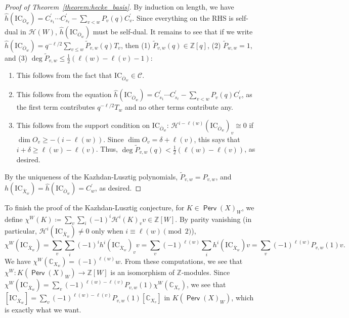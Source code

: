 \documentclass[leqno, openany]{memoir}
\theoremstyle{definition}
\theoremstyle{remark}
\theoremstyle{plain}
\theoremstyle{definition}
\theoremstyle{remark}
\newcommand{\mr}[1]{\mathrm{#1}}
\newcommand{\ms}[1]{\mathsf{#1}}
\DeclareMathOperator{\Perv}{\ms{Perv}}
\begin{document}
\begin{proof}[Proof of Theorem~\ref{theorem:hecke_basis}]
By induction on length, we have $\widehat{h}(\mr{IC}_{\overline{O}_w}) = C_{s_1}^{\prime}\cdots C_{s_{\ell}}^{\prime} - \sum_{v < w}P_v(q)C_v^{\prime}$. Since everything on the RHS is self-dual in $\mathcal{H}(W)$, $\widehat{h}(\mr{IC}_{\overline{O}_w})$ must be self-dual. It remains to see that if we write $\widehat{h}(\mr{IC}_{\overline{O}_w}) = q^{-\ell/2}\sum_{v \le w}\widetilde{P}_{v,w}(q)T_v$, then (1) $\widetilde{P}_{v,w}(q) \in \mathbb{Z}[q]$, (2) $\widetilde{P}_{w,w} = 1$, and (3) $\deg\widetilde{P}_{v,w} \le \frac{1}{2}(\ell(w) - \ell(v) - 1)$: \begin{enumerate}[(1)]
\item This follows from the fact that $\mr{IC}_{\overline{O}_w} \in \mathcal{C}$.

\item This follows from the equation $\widehat{h}(\mr{IC}_{\overline{O}_w}) = C_{s_1}^{\prime}\cdots C_{s_{\ell}}^{\prime} - \sum_{v < w}P_v(q)C_v^{\prime}$, as the first term contributes $q^{-\ell/2}T_w$ and no other terms contribute any.

\item This follows from the support condition on $\mr{IC}_{\overline{O}_w}$: $\mathcal{H}^{i - \ell(w)}(\mr{IC}_{\overline{O}_w})_v \cong 0$ if $\dim O_v \ge -(i - \ell(w))$. Since $\dim O_v = \delta + \ell(v)$, this says that $i + \delta \ge \ell(w) - \ell(v)$. Thus, $\deg\widetilde{P}_{v,w}(q) < \frac{1}{2}(\ell(w) - \ell(v))$, as desired.

\end{enumerate}

By the uniqueness of the Kazhdan-Lusztig polynomials, $\widetilde{P}_{v,w} = P_{v,w}$, and $h(\mr{IC}_{\overline{X}_w}) = \widehat{h}(\mr{IC}_{\overline{O}_w}) = C_w^{\prime}$, as desired.

\end{proof}

To finish the proof of the Kazhdan-Lusztig conjecture, for $K \in \Perv(X)_W$, we define $\chi^W(K) \coloneqq \sum_v\sum_i(-1)^i\mathcal{H}^i(K)_vv \in \mathbb{Z}[W]$. By parity vanishing (in particular, $\mathcal{H}^i(\mr{IC}_{\overline{X}_w}) \ne 0$ only when $i \equiv \ell(w) \pmod{2}$), 
\[ \chi^W(\mr{IC}_{\overline{X}_w}) = \sum_v\sum_i(-1)^ih^i(\mr{IC}_{\overline{X}_w})_vv = \sum_v(-1)^{\ell(w)}\sum_ih^i(\mr{IC}_{\overline{X}_w})v = \sum_v(-1)^{\ell(w)}P_{v,w}(1)v. \] We have $\chi^W(\mathbb{C}_{X_w}) = (-1)^{\ell(w)}w$. From these computations, we see that $\chi^W: K(\Perv(X)_W) \to \mathbb{Z}[W]$ is an isomorphism of $\mathbb{Z}$-modules. Since $\chi^W(\mr{IC}_{\overline{X}_w}) = \sum_v(-1)^{\ell(w) - \ell(v)}P_{v,w}(1)\chi^W(\mathbb{C}_{X_v})$, we see that $[\mr{IC}_{\overline{X}_w}] = \sum_v(-1)^{\ell(w) - \ell(v)}P_{v,w}(1)[\mathbb{C}_{X_v}]$ in $K(\Perv(X)_W)$, which is exactly what we want.
\end{document}
